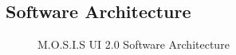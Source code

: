 \subsection{Software Architecture}
\begin{figure}[H]
	\caption{M.O.S.I.S UI 2.0 Software Architecture}
\end{figure}